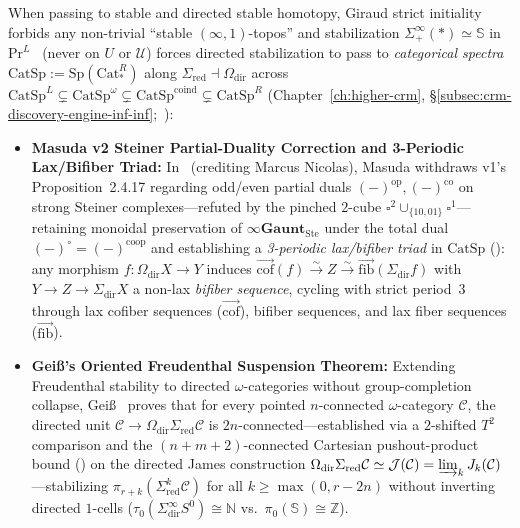 When passing to stable and directed stable homotopy, Giraud strict initiality~\cite[Thm.~6.1.0.6, \S 6.1.1]{Lurie09} forbids any non-trivial ``stable $(\infty, 1)$-topos'' and stabilization $\Sigma^\infty_+(*) \simeq \mathbb{S}$ in $\mathrm{Pr}^L$~\cite[\S\S 1.4.4, 4.8.2]{Lurie17} (never on $U$ or $\mathcal{U}$) forces directed stabilization to pass to \emph{categorical spectra} $\mathrm{CatSp} := \mathrm{Sp}(\mathrm{Cat}^R_*)$ along $\Sigma_{\mathrm{red}} \dashv \Omega_{\mathrm{dir}}$ across $\mathrm{CatSp}^L \subsetneq \mathrm{CatSp}^\omega \subsetneq \mathrm{CatSp}^{\mathrm{coind}} \subsetneq \mathrm{CatSp}^R$ (Chapter~\ref{ch:higher-crm}, \S\ref{subsec:crm-discovery-engine-inf-inf};~\cite{Masuda26,Heine26,ORW26}):
\begin{itemize}
  \item \textbf{Masuda v2 Steiner Partial-Duality Correction and 3-Periodic Lax/Bifiber Triad:} In~\cite[Section~2.4, Footnote~5]{Masuda26} (crediting Marcus Nicolas), Masuda withdraws v1's Proposition~2.4.17 regarding odd/even partial duals $(-)^{\mathrm{op}}, (-)^{\mathrm{co}}$ on strong Steiner complexes---refuted by the pinched $2$-cube $\square^2 \cup_{\{10, 01\}} \square^1$---retaining monoidal preservation of $\infty\mathbf{Gaunt}_{\mathrm{Ste}}$ under the total dual $(-)^{\circ} = (-)^{\mathrm{coop}}$ and establishing a \emph{3-periodic lax/bifiber triad} in $\mathrm{CatSp}$ (\cite[Theorem~5.3.1 and Remark~5.3.4]{Masuda26}): any morphism $f : \Omega_{\mathrm{dir}} X \to Y$ induces $\overrightarrow{\mathrm{cof}}(f) \xrightarrow{\sim} Z \xrightarrow{\sim} \overrightarrow{\mathrm{fib}}(\Sigma_{\mathrm{dir}} f)$ with $Y \to Z \to \Sigma_{\mathrm{dir}} X$ a non-lax \emph{bifiber sequence}, cycling with strict period~$3$ through lax cofiber sequences ($\overrightarrow{\mathrm{cof}}$), bifiber sequences, and lax fiber sequences ($\overrightarrow{\mathrm{fib}}$).
  \item \textbf{Gei\ss's Oriented Freudenthal Suspension Theorem:} Extending Freudenthal stability to directed $\omega$-categories without group-completion collapse, Gei\ss~\cite[Theorem~5.1 and Corollary~5.14]{Geiss26} proves that for every pointed $n$-connected $\omega$-category $\mathcal{C}$, the directed unit $\mathcal{C} \to \Omega_{\mathrm{dir}}\Sigma_{\mathrm{red}}\mathcal{C}$ is $2n$-connected---established via a $2$-shifted $T^2$ comparison and the $(n + m + 2)$-connected Cartesian pushout-product bound (\cite[Theorem~4.13]{Geiss26}) on the directed James construction $\Omega_{\mathrm{dir}}\Sigma_{\mathrm{red}}\mathcal{C} \simeq \mathcal{J}(\mathcal{C}) = \varinjlim_k J_k(\mathcal{C})$---stabilizing $\pi_{r+k}(\Sigma_{\mathrm{red}}^k \mathcal{C})$ for all $k \ge \max(0, r - 2n)$ without inverting directed $1$-cells ($\tau_0(\Sigma^\infty_{\mathrm{dir}} S^0) \cong \mathbb{N}$ vs.\ $\pi_0(\mathbb{S}) \cong \mathbb{Z}$).
\end{itemize}

